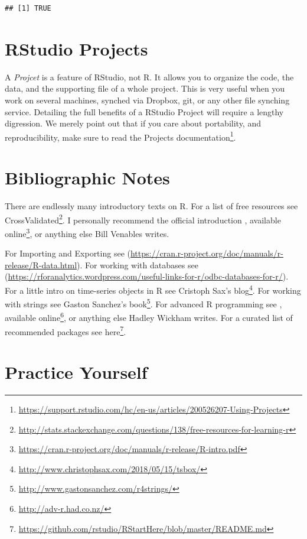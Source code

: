 \documentclass[]{book}
\renewcommand{\href}[2]{#2\footnote{\url{#1}}}
\theoremstyle{definition}
\theoremstyle{definition}
\theoremstyle{definition}
\theoremstyle{remark}
\begin{document}
\begin{verbatim}
## [1] TRUE
\end{verbatim}

\hypertarget{rstudio-projects}{%
\section{RStudio Projects}\label{rstudio-projects}}

A \emph{Projcet} is a feature of RStudio, not R.
It allows you to organize the code, the data, and the supporting file of a whole project.
This is very useful when you work on several machines, synched via Dropbox, git, or any other file synching service.
Detailing the full benefits of a RStudio Project will require a lengthy digression.
We merely point out that if you care about portability, and reproducibility, make sure to read the \href{https://support.rstudio.com/hc/en-us/articles/200526207-Using-Projects}{Projects documentation}.

\hypertarget{bibliographic-notes-1}{%
\section{Bibliographic Notes}\label{bibliographic-notes-1}}

There are endlessly many introductory texts on R.
For a list of free resources see \href{http://stats.stackexchange.com/questions/138/free-resources-for-learning-r}{CrossValidated}.
I personally recommend the official introduction \citet{venables2004introduction}, \href{https://cran.r-project.org/doc/manuals/r-release/R-intro.pdf}{available online}, or anything else Bill Venables writes.

For Importing and Exporting see (\url{https://cran.r-project.org/doc/manuals/r-release/R-data.html}).
For working with databases see (\url{https://rforanalytics.wordpress.com/useful-links-for-r/odbc-databases-for-r/}).
For a little intro on time-series objects in R see \href{http://www.christophsax.com/2018/05/15/tsbox/}{Cristoph Sax's blog}.
For working with strings see \href{http://www.gastonsanchez.com/r4strings/}{Gaston Sanchez's book}.
For advanced R programming see \citet{wickham2014advanced}, \href{http://adv-r.had.co.nz/}{available online}, or anything else Hadley Wickham writes. For a curated list of recommended packages see \href{https://github.com/rstudio/RStartHere/blob/master/README.md}{here}.

\hypertarget{practice-yourself}{%
\section{Practice Yourself}\label{practice-yourself}}
\end{document}
